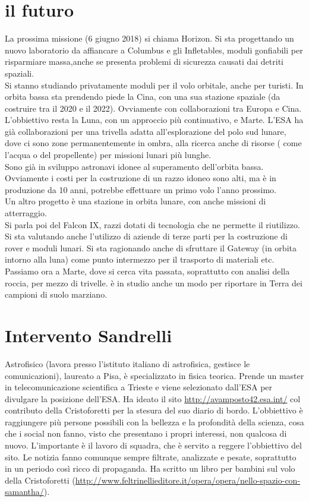 \documentclass[a4paper,12pt, oneside]{book}
\begin{document}
\section{il futuro}
 La prossima missione (6 giugno 2018) si chiama Horizon. Si sta progettando un nuovo laboratorio da affiancare a Columbus e gli Infletables, moduli gonfiabili per risparmiare massa,anche se presenta problemi di sicurezza causati dai detriti spaziali.\\
 Si stanno studiando privatamente moduli per il volo orbitale, anche per turisti. In orbita bassa sta prendendo piede la Cina, con una sua stazione spaziale (da costruire tra il 2020 e il 2022). Ovviamente con collaborazioni tra Europa e Cina.\\
 L'obbiettivo resta la Luna, con un approccio più continuativo, e Marte. L'ESA ha già collaborazioni per una trivella adatta all'esplorazione del polo sud lunare, dove ci sono zone permanentemente in ombra, alla ricerca anche di risorse ( come l'acqua o del propellente) per missioni lunari più lunghe.\\
Sono già in sviluppo astronavi idonee al superamento dell'orbita bassa. Ovviamente i costi per la costruzione di un razzo idoneo sono alti, ma è in produzione da 10 anni, potrebbe effettuare un primo volo l'anno prossimo.\\
Un altro progetto è una stazione in orbita lunare, con anche missioni di atterraggio.\\
Si parla poi del Falcon IX, razzi dotati di tecnologia che ne permette il riutilizzo.\\
Si sta valutando anche l'utilizzo di aziende di terze parti per la costruzione di rover e moduli lunari. Si sta ragionando anche di sfruttare il Gateway (in orbita intorno alla luna) come punto intermezzo per il trasporto di materiali etc.\\
Passiamo ora a Marte, dove si cerca vita passata, soprattutto con analisi della roccia, per mezzo di trivelle. è in studio anche un modo per riportare in Terra dei campioni di suolo marziano.
\newpage
\section{Intervento Sandrelli}
Astrofisico (lavora presso l'istituto italiano di astrofisica, gestisce le comunicazioni), laureato a Pisa, è specializzato in fisica teorica. Prende un master in telecomunicazione scientifica a Trieste  e viene selezionato dall'ESA per divulgare la posizione dell'ESA. Ha ideato il sito \href{url}{http://avamposto42.esa.int/} col contributo della Cristoforetti per la stesura del suo diario di bordo. L'obbiettivo è raggiungere più persone possibili con la bellezza e la profondità della scienza, cosa che i social non fanno, visto che presentano i propri interessi, non qualcosa di nuovo. L'importante è il lavoro di squadra, che è servito a reggere l'obbiettivo del sito. Le notizia fanno comunque sempre filtrate, analizzate e pesate, soprattutto in un periodo così ricco di propaganda. Ha scritto un libro per bambini sul volo della Cristoforetti (\href{url}{http://www.feltrinellieditore.it/opera/opera/nello-spazio-con-samantha/}).
\end{document}
